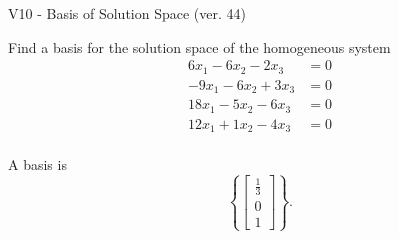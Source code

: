 \begin{exercise}
  \begin{exerciseTitle}V10 - Basis of Solution Space (ver. 44)\end{exerciseTitle}
  \begin{exerciseStatement}
    Find a basis for the solution space of the homogeneous system 
\begin{align*}
 6 x_ 1 -6 x_ 2 -2 x_ 3 &= 0  \\ 
  -9 x_ 1 -6 x_ 2 + 3 x_ 3 &= 0  \\ 
  18 x_ 1 -5 x_ 2 -6 x_ 3 &= 0  \\ 
  12 x_ 1 + 1 x_ 2 -4 x_ 3 &= 0  \\ 
 \end{align*}


 
  \end{exerciseStatement}

  \begin{exerciseAnswer}
   A basis is   
\[\left\{\left[\begin{array}{c}
\frac{1}{3} \\
0 \\
1
\end{array}\right]\right\}.\]

  


  \end{exerciseAnswer}
\end{exercise}